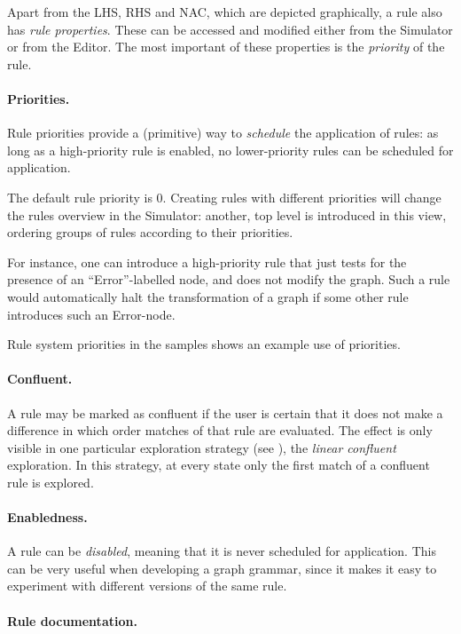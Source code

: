 Apart from the LHS, RHS and NAC, which are depicted graphically, a rule also
has \emph{rule properties}. These can be accessed and modified either from the
Simulator or from the Editor. The most important of these properties is the
\emph{priority} of the rule. 

\paragraph{Priorities.}

Rule priorities provide a (primitive) way to
\emph{schedule} the application of rules: as long as a high-priority rule is
enabled, no lower-priority rules can be scheduled for application.

The default rule priority is 0. Creating rules with different priorities will
change the rules overview in the Simulator: another, top level is introduced in
this view, ordering groups of rules according to their priorities.

For instance, one can introduce a high-priority rule that just tests for the
presence of an ``\textsf{Error}''-labelled node, and does not modify the
graph. Such a rule would automatically halt the transformation of a graph if
some other rule introduces such an \textsf{Error}-node.

Rule system \textsf{priorities} in the \GROOVE{} samples shows an example use
of priorities.

\paragraph{Confluent.}

A rule may be marked as confluent if the user is certain that it does not
make a difference in which order matches of that rule are evaluated. The effect
is only visible in one particular exploration strategy (see ),
the \emph{linear confluent} exploration. In this strategy, at every state only
the first match of a confluent rule is explored.

\paragraph{Enabledness.}

A rule can be \emph{disabled}, meaning that it is never scheduled for
application. This can be very useful when developing a graph grammar, since it
makes it easy to experiment with different versions of the same rule.

\paragraph{Rule documentation.}

